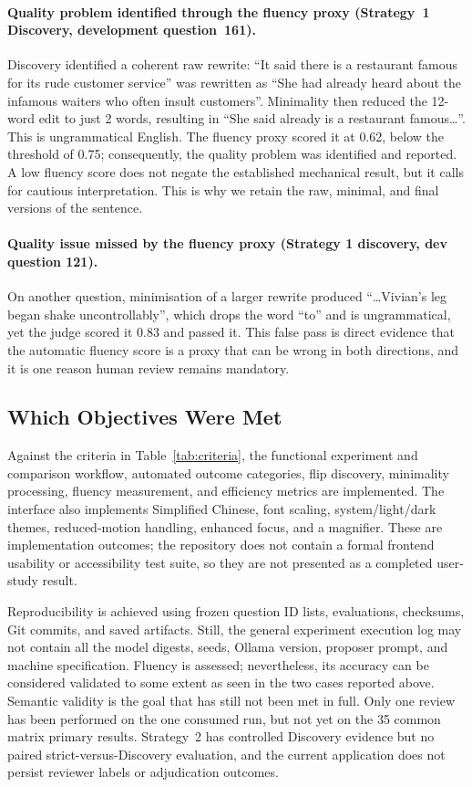 \documentclass[11pt,a4paper]{article}
\begin{document}
\paragraph{Quality problem identified through the fluency proxy (Strategy~1
Discovery, development question~161).}
Discovery identified a coherent raw rewrite: ``It said there is a restaurant famous
for its rude customer service'' was rewritten as ``She had already heard about the
infamous waiters who often insult customers''. Minimality then reduced the 12-word
edit to just 2 words, resulting in ``She said already is a restaurant famous\ldots''.
This is ungrammatical English. The fluency proxy scored it at 0.62, below the
threshold of 0.75; consequently, the quality problem was identified and reported.
A low fluency score does not negate the established mechanical result, but it calls
for cautious interpretation. This is why we retain the raw, minimal, and final
versions of the sentence.

\paragraph{Quality issue missed by the fluency proxy (Strategy 1 discovery, dev
question 121).}
On another question, minimisation of a larger rewrite produced ``\ldots Vivian's leg
began shake uncontrollably'', which drops the word ``to'' and is ungrammatical, yet
the judge scored it 0.83 and passed it. This false pass is direct evidence that the
automatic fluency score is a proxy that can be wrong in both directions, and it is one
reason human review remains mandatory.

\subsection{Which Objectives Were Met}

Against the criteria in Table~\ref{tab:criteria}, the functional experiment and
comparison workflow, automated outcome categories, flip discovery, minimality
processing, fluency measurement, and efficiency metrics are implemented. The
interface also implements Simplified Chinese, font scaling, system/light/dark themes,
reduced-motion handling, enhanced focus, and a magnifier. These are implementation
outcomes; the repository does not contain a formal frontend usability or accessibility
test suite, so they are not presented as a completed user-study result.

Reproducibility is achieved using frozen question ID lists, evaluations, checksums,
Git commits, and saved artifacts. Still, the general experiment execution log may not
contain all the model digests, seeds, Ollama version, proposer prompt, and machine
specification. Fluency is assessed; nevertheless, its accuracy can be considered
validated to some extent as seen in the two cases reported above. Semantic validity is
the goal that has still not been met in full. Only one review has been performed on
the one consumed run, but not yet on the 35 common matrix primary results.
Strategy~2 has controlled Discovery evidence but no paired strict-versus-Discovery
evaluation, and the current application does not persist reviewer labels or
adjudication outcomes.
\end{document}
